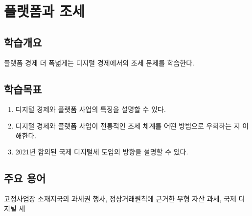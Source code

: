 \chapter{플랫폼과 조세}\label{cha:taxation}

\section*{학습개요}
플랫폼 경제 더 폭넓게는 디지털 경제에서의 조세 문제를 학습한다.


\section*{학습목표}
\begin{enumerate}
\item 디지털 경제와 플랫폼 사업의 특징을 설명할 수 있다.
\item 디지털 경제와 플랫폼 사업이 전통적인 조세 체계를 어떤 방법으로 우회하는 지 이해한다.
\item 2021년 합의된 국제 디지털세 도입의 방향을 설명할 수 있다.
\end{enumerate}

\section*{주요 용어}
고정사업장 소재지국의 과세권 행사, 정상거래원칙에 근거한 무형 자산 과세, 국제 디지털 세

\pagebreak

